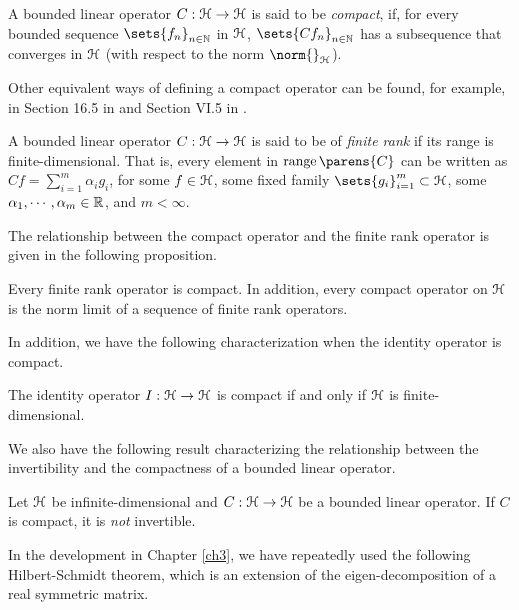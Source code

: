 \begin{definition}
	A bounded linear operator $C: \mathcal{H} \to \mathcal{H}$ is said to be \textit{compact}, if, for every bounded sequence $\sets{f_n}_{n \in \Natural}$ in $\mathcal{H}$, $\sets{C f_n}_{n \in \Natural}$ has a subsequence that converges in $\mathcal{H}$ (with respect to the norm $\norm{}_{\calH}$). 
\end{definition}

Other equivalent ways of defining a compact operator can be found, for example, in Section 16.5 in \textcite{Royden2018-cd} and Section VI.5 in \textcite{Reed2012-xs}. 

\begin{definition}
	A bounded linear operator $C: \mathcal{H} \to \mathcal{H}$ is said to be of \textit{finite rank} if its range is finite-dimensional. That is, every element in $\range \parens{C}$ can be written as $Cf = \sum_{i=1}^m \alpha_i g_i$, for some $f \in \mathcal{H}$, some fixed family $\sets{g_i}_{i=1}^m \subset \calH$, some $\alpha_1, \cdots, \alpha_m \in \mathbb{R}$, and $m < \infty$. 
\end{definition}

The relationship between the compact operator and the finite rank operator is given in the following proposition. 

\begin{proposition}
	Every finite rank operator is compact. In addition, every compact operator on $\mathcal{H}$ is the norm limit of a sequence of finite rank operators. 
\end{proposition}

In addition, we have the following characterization when the identity operator is compact. 

\begin{proposition}
	The identity operator $I: \mathcal{H} \to \mathcal{H}$ is compact if and only if $\mathcal{H}$ is finite-dimensional. 
\end{proposition}

We also have the following result characterizing the relationship between the invertibility and the compactness of a bounded linear operator. 

\begin{proposition}\label{prop-invertible-compact-infdim}
	Let $\mathcal{H}$ be infinite-dimensional and $C: \mathcal{H} \to \mathcal{H}$ be a bounded linear operator. If $C$ is compact, it is \emph{not} invertible. 
\end{proposition}

In the development in Chapter \ref{ch3}, we have repeatedly used the following Hilbert-Schmidt theorem, which is an extension of the eigen-decomposition of a real symmetric matrix. 

